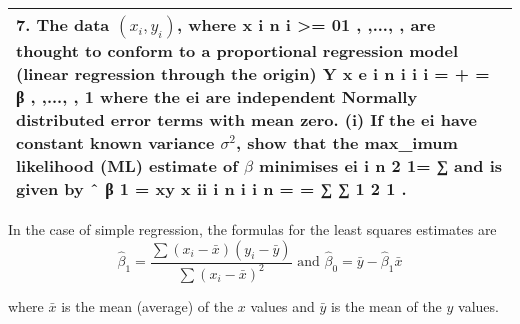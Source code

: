 \documentclass[a4paper,12pt]{article}
\begin{document}
\begin{table}[ht!]
     \centering
     \begin{tabular}{|p{15cm}|}
     \hline        
7. The data $( x_i, y_i)$, where x i n i >= 01 , ,..., , are thought to conform to a proportional regression model (linear regression through the origin)
Y x e i n i i i = + = β , ,..., , 1
where the ei are independent Normally distributed error terms with mean zero.
(i) If the ei have constant known variance 
$\sigma^2$, show that the max_{i}mum likelihood (ML)
estimate of 
$\beta$
 minimises ei i n 2 1= ∑ and is given by
ˆ β 1 =
xy
x
ii
i
n
i
i
n =
=
∑
∑
1
2
1
.

\\ \hline
      \end{tabular}
    \end{table}
    

    


\begin{framed}
In the case of simple regression, the formulas for the least squares estimates are 
\[{\displaystyle {\widehat {\beta }}_{1}={\frac {\sum (x_{i}-{\bar {x}})(y_{i}-{\bar {y}})}{\sum (x_{i}-{\bar {x}})^{2}}}{\text{ and }}{\widehat {\beta }}_{0}={\bar {y}}-{\widehat {\beta }}_{1}{\bar {x}}} \]

where 
$ {\displaystyle {\bar {x}}} $
 is the mean (average) of the 
$ {\displaystyle x} $
 values and 
${\displaystyle {\bar {y}}}$ 
 is the mean of the 
$ {\displaystyle y} $
 values.

\end{framed}
\end{document}
